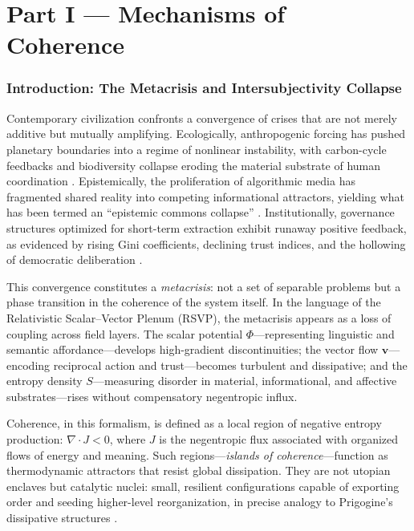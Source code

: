 \documentclass[12pt,a4paper]{article}
\begin{document}
\newpage
\tableofcontents

\newpage
\part*{Part I — Mechanisms of Coherence}

\section{Introduction: The Metacrisis and Intersubjectivity Collapse}

Contemporary civilization confronts a convergence of crises that are not merely additive but mutually amplifying. Ecologically, anthropogenic forcing has pushed planetary boundaries into a regime of nonlinear instability, with carbon-cycle feedbacks and biodiversity collapse eroding the material substrate of human coordination \cite{rockstrom2009planetary}. Epistemically, the proliferation of algorithmic media has fragmented shared reality into competing informational attractors, yielding what has been termed an ``epistemic commons collapse'' \cite{pachniewski2024intersubjectivity}. Institutionally, governance structures optimized for short-term extraction exhibit runaway positive feedback, as evidenced by rising Gini coefficients, declining trust indices, and the hollowing of democratic deliberation \cite{schmachtenberger2020metacrisis}.

This convergence constitutes a \emph{metacrisis}: not a set of separable problems but a phase transition in the coherence of the system itself. In the language of the Relativistic Scalar–Vector Plenum (RSVP), the metacrisis appears as a loss of coupling across field layers. The scalar potential $\Phi$—representing linguistic and semantic affordance—develops high-gradient discontinuities; the vector flow $\bm{v}$—encoding reciprocal action and trust—becomes turbulent and dissipative; and the entropy density $S$—measuring disorder in material, informational, and affective substrates—rises without compensatory negentropic influx.

Coherence, in this formalism, is defined as a local region of negative entropy production: $\nabla\!\cdot\!J < 0$, where $J$ is the negentropic flux associated with organized flows of energy and meaning. Such regions—\emph{islands of coherence}—function as thermodynamic attractors that resist global dissipation. They are not utopian enclaves but catalytic nuclei: small, resilient configurations capable of exporting order and seeding higher-level reorganization, in precise analogy to Prigogine’s dissipative structures \cite{prigogine1984order}.
\end{document}
